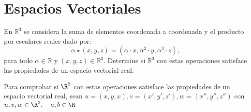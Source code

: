 \section{Espacios Vectoriales}

\begin{ejercicio} En $\mathbb{R}^3$ se considera la suma de elementos coordenada a coordenada y el producto por escalares reales dado por:
	\[ \alpha \star (x,y,z) = (\alpha \cdot x, \alpha^2 \cdot y, \alpha^3 \cdot z), \]
	para todo $\alpha \in \mathbb{R}$ y $(x,y,z) \in \mathbb{R}^3$. Determine si $\mathbb{R}^3$ con estas operaciones satisface las propiedades de un espacio vectorial real.

	Para comprobar si $\R^3$ con estas operaciones satisface las propiedades de un espacio vectorial real, sean $u = (x,y,x), v = (x',y',z'), w = (x'',y'', z'')$ con $u,v,w \in \R^3, \quad a,b \in \R$


\end{ejercicio}
